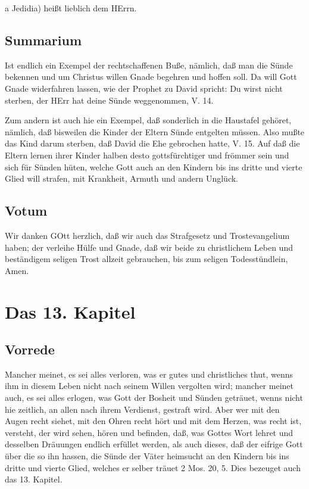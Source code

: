 a Jedidia) heißt lieblich dem HErrn.

\section{Summarium}

Ist endlich ein Exempel der rechtschaffenen Buße, nämlich, daß man die Sünde bekennen und um Christus willen Gnade begehren und hoffen soll. Da will Gott Gnade widerfahren lassen, wie der Prophet zu David spricht: Du wirst nicht sterben, der HErr hat deine Sünde weggenommen, V. 14.

Zum andern ist auch hie ein Exempel, daß sonderlich in die Haustafel gehöret, nämlich, daß bisweilen die Kinder der Eltern Sünde entgelten müssen. Also mußte das Kind darum sterben, daß David die Ehe gebrochen hatte, V. 15. Auf daß die Eltern lernen ihrer Kinder halben desto gottsfürchtiger und frömmer sein und sich für Sünden hüten, welche Gott auch an den Kindern bis ins dritte und vierte Glied will strafen, mit Krankheit, Armuth und andern Unglück.

\section{Votum}

Wir danken GOtt herzlich, daß wir auch das Strafgesetz und Trostevangelium haben; der verleihe Hülfe und Gnade, daß wir beide zu christlichem Leben und beständigem seligen Trost allzeit gebrauchen, bis zum seligen Todesstündlein, Amen.

\chapter{Das 13. Kapitel}

\section{Vorrede}

Mancher meinet, es sei alles verloren, was er gutes und christliches thut, wenns ihm in diesem Leben nicht nach seinem Willen vergolten wird; mancher meinet auch, es sei alles erlogen, was Gott der Bosheit und Sünden geträuet, wenns nicht hie zeitlich, an allen nach ihrem Verdienst, gestraft wird. Aber wer mit den Augen recht siehet, mit den Ohren recht hört und mit dem Herzen, was recht ist, versteht, der wird sehen, hören und befinden, daß, was Gottes Wort lehret und desselben Dräuungen endlich erfüllet werden, als auch dieses, daß der eifrige Gott über die so ihn hassen, die Sünde der Väter heimsucht an den Kindern bis ins dritte und vierte Glied, welches er selber träuet 2 Mos. 20, 5. Dies bezeuget auch das 13. Kapitel.

